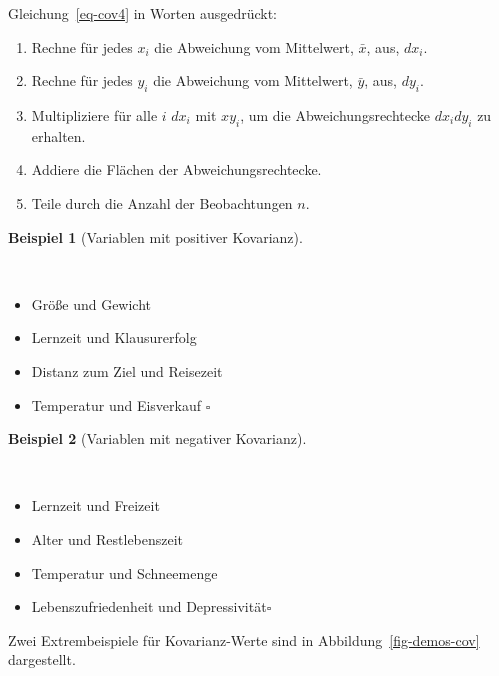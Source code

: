 \documentclass[
  letterpaper,
  twoside,
  open=any]{scrbook}
\providecommand{\tightlist}{%
  \setlength{\itemsep}{0pt}\setlength{\parskip}{0pt}}\usepackage{longtable,booktabs,array}
\theoremstyle{definition}
\theoremstyle{definition}
\theoremstyle{definition}
\newtheorem{example}{Beispiel}[chapter]
\theoremstyle{remark}
\begin{document}
Gleichung~\ref{eq-cov4} in Worten ausgedrückt:

\begin{enumerate}
\def\labelenumi{\arabic{enumi}.}
\tightlist
\item
  Rechne für jedes \(x_i\) die Abweichung vom Mittelwert, \(\bar{x}\),
  aus, \(dx_i\).
\item
  Rechne für jedes \(y_i\) die Abweichung vom Mittelwert, \(\bar{y}\),
  aus, \(dy_i\).
\item
  Multipliziere für alle \(i\) \(dx_i\) mit \(xy_i\), um die
  Abweichungsrechtecke \(dx_i dy_i\) zu erhalten.
\item
  Addiere die Flächen der Abweichungsrechtecke.
\item
  Teile durch die Anzahl der Beobachtungen \(n\).
\end{enumerate}

\begin{example}[Variablen mit positiver
Kovarianz]\protect\hypertarget{exm-pos-kov}{}\label{exm-pos-kov}

~

\begin{itemize}
\tightlist
\item
  Größe und Gewicht
\item
  Lernzeit und Klausurerfolg
\item
  Distanz zum Ziel und Reisezeit
\item
  Temperatur und Eisverkauf \(\square\)
\end{itemize}

\end{example}

\begin{example}[Variablen mit negativer
Kovarianz]\protect\hypertarget{exm-neg-kov}{}\label{exm-neg-kov}

~

\begin{itemize}
\tightlist
\item
  Lernzeit und Freizeit
\item
  Alter und Restlebenszeit
\item
  Temperatur und Schneemenge
\item
  Lebenszufriedenheit und Depressivität\(\square\)
\end{itemize}

\end{example}

Zwei Extrembeispiele für Kovarianz-Werte sind in
Abbildung~\ref{fig-demos-cov} dargestellt.
\end{document}
